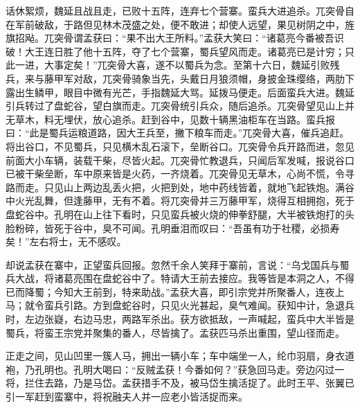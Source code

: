 话休絮烦，魏延且战且走，已败十五阵，连弃七个营寨。蛮兵大进追杀。兀突骨自在军前破敌，于路但见林木茂盛之处，便不敢进；却使人远望，果见树阴之中，旌旗招飐。兀突骨谓孟获曰：“果不出大王所料。”孟获大笑曰：“诸葛亮今番被吾识破！大王连日胜了他十五阵，夺了七个营寨，蜀兵望风而走。诸葛亮已是计穷；只此一进，大事定矣！”兀突骨大喜，遂不以蜀兵为念。至第十六日，魏延引败残兵，来与藤甲军对敌，兀突骨骑象当先，头戴日月狼须帽，身披金珠缨络，两肋下露出生鳞甲，眼目中微有光芒，手指魏延大骂。延拨马便走。后面蛮兵大进。魏延引兵转过了盘蛇谷，望白旗而走。兀突骨统引兵众，随后追杀。兀突骨望见山上并无草木，料无埋伏，放心追杀。赶到谷中，见数十辆黑油柜车在当路。蛮兵报曰：“此是蜀兵运粮道路，因大王兵至，撇下粮车而走。”兀突骨大喜，催兵追赶。将出谷口，不见蜀兵，只见横木乱石滚下，垒断谷口。兀突骨令兵开路而进，忽见前面大小车辆，装载干柴，尽皆火起。兀突骨忙教退兵，只闻后军发喊，报说谷口已被干柴垒断，车中原来皆是火药，一齐烧着。兀突骨见无草木，心尚不慌，令寻路而走。只见山上两边乱丢火把，火把到处，地中药线皆着，就地飞起铁炮。满谷中火光乱舞，但逢藤甲，无有不着。将兀突骨并三万藤甲军，烧得互相拥抱，死于盘蛇谷中。孔明在山上往下看时，只见蛮兵被火烧的伸拳舒腿，大半被铁炮打的头脸粉碎，皆死于谷中，臭不可闻。孔明垂泪而叹曰：“吾虽有功于社稷，必损寿矣！”左右将士，无不感叹。

却说孟获在寨中，正望蛮兵回报。忽然千余人笑拜于寨前，言说：“乌戈国兵与蜀兵大战，将诸葛亮围在盘蛇谷中了。特请大王前去接应。我等皆是本洞之人，不得已而降蜀；今知大王前到，特来助战。”孟获大喜，即引宗党并所聚番人，连夜上马；就令蛮兵引路。方到盘蛇谷时，只见火光甚起，臭气难闻。获知中计，急退兵时，左边张嶷，右边马忠，两路军杀出。获方欲抵敌，一声喊起，蛮兵中大半皆是蜀兵，将蛮王宗党并聚集的番人，尽皆擒了。孟获匹马杀出重围，望山径而走。

正走之间，见山凹里一簇人马，拥出一辆小车；车中端坐一人，纶巾羽扇，身衣道袍，乃孔明也。孔明大喝曰：“反贼孟获！今番如何？”获急回马走。旁边闪过一将，拦住去路，乃是马岱。孟获措手不及，被马岱生擒活捉了。此时王平、张翼已引一军赶到蛮寨中，将祝融夫人并一应老小皆活捉而来。

